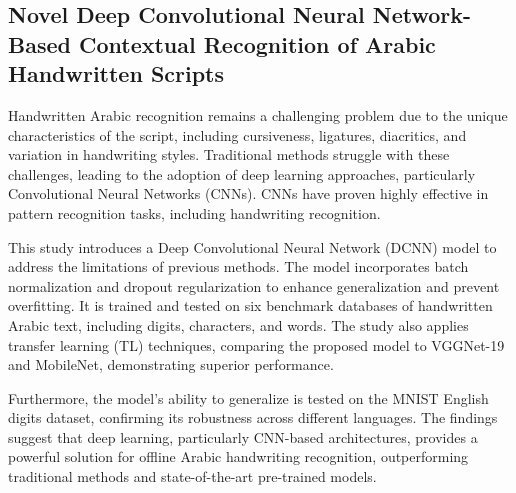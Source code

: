 \documentclass{article}
\begin{document}
\subsection{Novel Deep Convolutional Neural Network-Based Contextual Recognition of Arabic Handwritten Scripts}
Handwritten Arabic recognition remains a challenging problem due to the unique characteristics of the script, including cursiveness, ligatures, diacritics, and variation in handwriting styles. Traditional methods struggle with these challenges, leading to the adoption of deep learning approaches, particularly Convolutional Neural Networks (CNNs). CNNs have proven highly effective in pattern recognition tasks, including handwriting recognition.

This study introduces a Deep Convolutional Neural Network (DCNN) model to address the limitations of previous methods. The model incorporates batch normalization and dropout regularization to enhance generalization and prevent overfitting. It is trained and tested on six benchmark databases of handwritten Arabic text, including digits, characters, and words. The study also applies transfer learning (TL) techniques, comparing the proposed model to VGGNet-19 and MobileNet, demonstrating superior performance.

Furthermore, the model’s ability to generalize is tested on the MNIST English digits dataset, confirming its robustness across different languages. The findings suggest that deep learning, particularly CNN-based architectures, provides a powerful solution for offline Arabic handwriting recognition, outperforming traditional methods and state-of-the-art pre-trained models.
\end{document}
